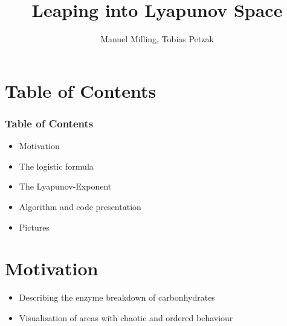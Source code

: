 \documentclass[ignorenonframetext]{beamer}
\title[]{Leaping into Lyapunov Space}
\subtitle{}
\author[Milling, Petzak]{\large{Manuel Milling, Tobias Petzak} \\
}
\institute[Universität Augsburg]{Institut für Physik der Universität Augsburg}
\date[26.08.2016]
\begin{document}
\frame[plain]{\titlepage}

\section*{Table of Contents}
\begin{frame}
\frametitle{Table of Contents}
\begin{itemize}
\item Motivation
\item The logistic formula
\item The Lyapunov-Exponent
\item Algorithm and code presentation
\item Pictures
\end{itemize}
\end{frame}

\section*{Motivation}
\begin{frame}
\begin{itemize}
\item Describing the enzyme breakdown of carbonhydrates
\item Visualisation of areas with chaotic and ordered behaviour
\end{itemize}
\end{frame}
\end{document}
